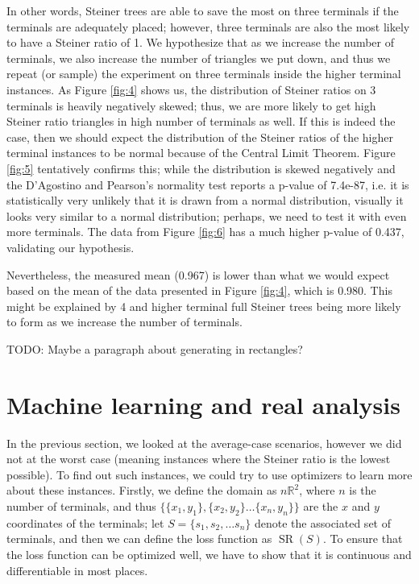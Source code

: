 \documentclass{mpaper}
\begin{document}
In other words, Steiner trees are able to save the most on three terminals if the terminals are adequately placed; however, three terminals are also the most likely to have a Steiner ratio of 1. We hypothesize that as we increase the number of terminals, we also increase the number of triangles we put down, and thus we repeat (or sample) the experiment on three terminals inside the higher terminal instances. As Figure \ref{fig:4} shows us, the distribution of Steiner ratios on 3 terminals is heavily negatively skewed; thus, we are more likely to get high Steiner ratio triangles in high number of terminals as well. If this is indeed the case, then we should expect the distribution of the Steiner ratios of the higher terminal instances to be normal because of the Central Limit Theorem. Figure \ref{fig:5} tentatively confirms this; while the distribution is skewed negatively and the D'Agostino and Pearson's normality test reports a p-value of 7.4e-87, i.e. it is statistically very unlikely that it is drawn from a normal distribution, visually it looks very similar to a normal distribution; perhaps, we need to test it with even more terminals. The data from Figure \ref{fig:6} has a much higher p-value of 0.437, validating our hypothesis.

Nevertheless, the measured mean (0.967) is lower than what we would expect based on the mean of the data presented in Figure \ref{fig:4}, which is 0.980. This might be explained by 4 and higher terminal full Steiner trees being more likely to form as we increase the number of terminals. 

TODO: Maybe a paragraph about generating in rectangles?

\section{Machine learning and real analysis}


In the previous section, we looked at the average-case scenarios, however we did not at the worst case (meaning instances where the Steiner ratio is the lowest possible). To find out such instances, we could try to use optimizers to learn more about these instances. Firstly, we define the domain as $n\mathbb{R}^{2}$, where $n$ is the number of terminals, and thus $\{\{x_1, y_1\}, \{x_2, y_2\} \dots \{x_n, y_n\}\}$ are the $x$ and $y$ coordinates of the terminals; let $S=\{s_1, s_2, \dots s_n\}$ denote the associated set of terminals, and then we can define the loss function as $\operatorname{SR}(S)$. To ensure that the loss function can be optimized well, we have to show that it is continuous and differentiable in most places.
\end{document}
